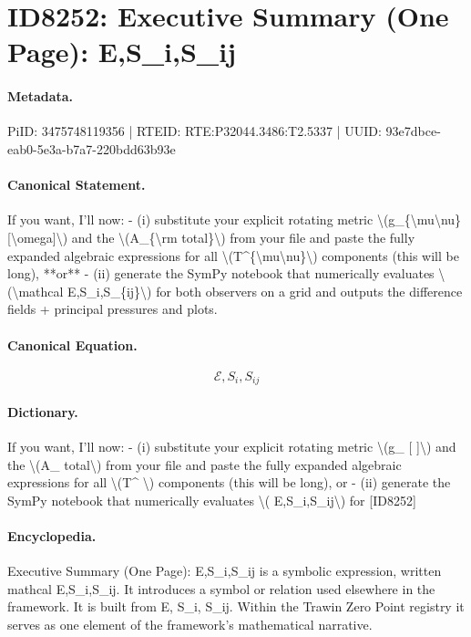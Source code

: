 \section*{ID8252: Executive Summary (One Page): E,S\_i,S\_ij}
\paragraph{Metadata.}
PiID: 3475748119356 | RTEID: RTE:P32044.3486:T2.5337 | UUID: 93e7dbce-eab0-5e3a-b7a7-220bdd63b93e

\paragraph{Canonical Statement.}
If you want, I’ll now: - (i) substitute your explicit rotating metric \textbackslash{}(g\_\{\textbackslash{}mu\textbackslash{}nu\}[\textbackslash{}omega]\textbackslash{}) and the \textbackslash{}(A\_\{\textbackslash{}rm total\}\textbackslash{}) from your file and paste the fully expanded algebraic expressions for all \textbackslash{}(T\textasciicircum{}\{\textbackslash{}mu\textbackslash{}nu\}\textbackslash{}) components (this will be long), **or** - (ii) generate the SymPy notebook that numerically evaluates \textbackslash{}(\textbackslash{}mathcal E,S\_i,S\_\{ij\}\textbackslash{}) for both observers on a grid and outputs the difference fields + principal pressures and plots.

\paragraph{Canonical Equation.}
\[
\mathcal E,S_i,S_{ij}
\]

\paragraph{Dictionary.}
If you want, I’ll now: - (i) substitute your explicit rotating metric \textbackslash{}(g\_ [ ]\textbackslash{}) and the \textbackslash{}(A\_ total\textbackslash{}) from your file and paste the fully expanded algebraic expressions for all \textbackslash{}(T\textasciicircum{} \textbackslash{}) components (this will be long), or - (ii) generate the SymPy notebook that numerically evaluates \textbackslash{}( E,S\_i,S\_ij\textbackslash{}) for [ID8252]

\paragraph{Encyclopedia.}
Executive Summary (One Page): E,S\_i,S\_ij is a symbolic expression, written mathcal E,S\_i,S\_ij. It introduces a symbol or relation used elsewhere in the framework. It is built from E, S\_i, S\_ij. Within the Trawin Zero Point registry it serves as one element of the framework's mathematical narrative.
